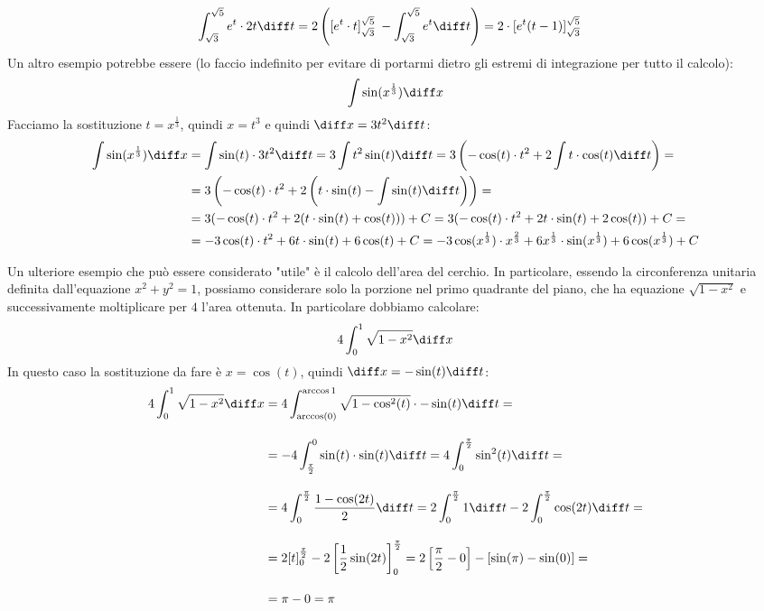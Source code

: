 \begin{align*}
	\int_{\sqrt{3}}^{\sqrt{5}} e^t \cdot 2t \diff t &= 2\left( 
    [e^t \cdot t]_{\sqrt{3}}^{\sqrt{5}} \;- \int_{\sqrt{3}}^{\sqrt{5}} e^t 
    \diff t\right) = 2 \cdot [e^t (t - 1)]_{\sqrt{3}}^{\sqrt{5}}
\end{align*}
Un altro esempio potrebbe essere (lo faccio indefinito per evitare di portarmi 
dietro gli estremi di integrazione per tutto il calcolo):
\begin{align*}
	\int \sin(x^{\frac{1}{3}}) \diff x
\end{align*}
Facciamo la sostituzione $t = x^{\frac{1}{3}}$, quindi $x = t^3$ e quindi 
$\diff x = 3 t^2 \diff t$:
\begin{align*}
	\int \sin(x^{\frac{1}{3}}) \diff x &= \int \sin(t) \cdot 3t^2 \diff t = 3 
    \int t^2 \sin(t) \diff t = 3 \left(-\cos(t) \cdot t^2 + 2\int t \cdot 
    \cos(t) \diff t \right) =\\
	&= 3 \left(-\cos(t) \cdot t^2 + 2\left(t \cdot \sin(t) - \int \sin(t) 
    \diff t \right)\right) =\\
	&= 3 (-\cos(t) \cdot t^2 + 2(t \cdot \sin(t) + \cos (t) )) + C = 3 
    (-\cos(t) \cdot t^2 + 2t \cdot \sin(t) + 2\cos (t) ) + C=\\
	&= -3\cos(t) \cdot t^2 + 6t \cdot \sin(t) + 6\cos (t) + C =  -3\cos(x^{
        \frac{1}{3}}) \cdot x^{\frac{2}{3}} + 6x^{\frac{1}{3}} \cdot \sin(
    x^\frac{1}{3}) + 6\cos (x^\frac{1}{3}) + C
\end{align*}

Un ulteriore esempio che può essere considerato "utile" è il calcolo dell'area 
del cerchio. In particolare, essendo la circonferenza unitaria definita 
dall'equazione $x^2 + y^2 = 1$, possiamo considerare solo la porzione nel primo 
quadrante del piano, che ha equazione $\sqrt{1-x^2}$ e successivamente 
moltiplicare per $4$ l'area ottenuta. In particolare dobbiamo calcolare:
\begin{equation*}
	4 \int_0^1 \sqrt{1-x^2} \diff x
\end{equation*}
In questo caso la sostituzione da fare è $x = \cos(t)$, quindi $\diff x = 
-\sin(t) \diff t$:
\begin{align*}
	4 \int_0^1 \sqrt{1-x^2} \diff x &= 4 \int_{\arccos(0)}^{\arccos{1}} 
    \sqrt{1-\cos^2(t)} \cdot - \sin(t) \diff t = \\[10pt]
	&= -4 \int_{\frac{\pi}{2}}^0 \sin(t) \cdot \sin(t) \diff t = 4 
    \int_0^{\frac{\pi}{2}} \sin^2(t)\diff t = \\[10pt]
	&= 4 \int_0^{\frac{\pi}{2}} \dfrac{1 - \cos(2t)}{2}\diff t = 2 
    \int_0^{\frac{\pi}{2}} 1 \diff t - 2 \int_0^{\frac{\pi}{2}} \cos(2t) 
    \diff t = \\[10pt]
	&= 2[t]_0^{\frac{\pi}{2}} - 2\left[\dfrac{1}{2} \sin(2t) \right]_0^{
        \frac{\pi}{2}} = 2 \left[\dfrac{\pi}{2} - 0\right] - [\sin(\pi) - 
    \sin(0)] = \\[10pt]
	&= \pi - 0 = \pi
\end{align*}


